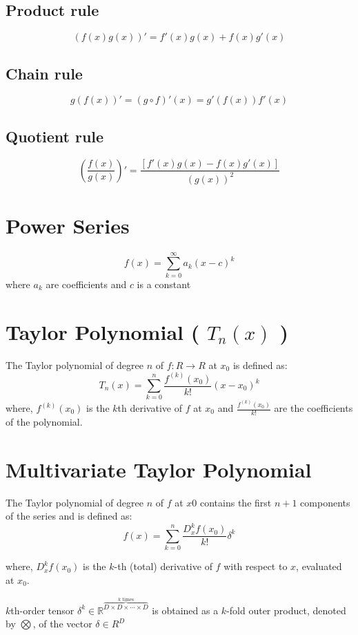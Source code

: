 \subsection{Product rule}
\[
    (f(x)g(x))' = f'(x)g(x) + f(x)g'(x)
\]

\subsection{Chain rule}
\[
    g(f(x))' = (g \circ f)'(x) = g'(f(x))f'(x)
\]

\subsection{Quotient rule}
\[
    \left( \displaystyle\frac{f(x)}{g(x)} \right)' = \displaystyle\frac{[f'(x)g(x) - f(x)g'(x)]}{(g(x))^2}
\]

\section{Power Series}\label{Power Series}
\[
    f(x) = \sum_{k=0}^{\infty} a_k (x-c)^k
\]
where $a_k$ are coefficients and $c$ is a constant

\section{Taylor Polynomial ( $T_n(x)$ )}\label{Taylor Polynomial}
The Taylor polynomial of degree $n$ of $f : R \rightarrow R$ at $x_0$ is defined as: 
\[
    T_n(x) = \sum_{k=0}^{n}\displaystyle\frac{f^{(k)}(x_0)}{k!}(x-x_0)^k
\]
where, $f^{(k)}(x_0)$ is the $k$th derivative of $f$ at $x_0$ and $\displaystyle\frac{f^{(k)}(x_0)}{k!}$ are the coefficients of the polynomial.


\section{Multivariate Taylor Polynomial}\label{Multivariate Taylor Polynomial}
The Taylor polynomial of degree $n$ of $f$ at $x0$ contains the first $n + 1$ components of the series and is defined as:
\[
    f(x) = \sum_{k=0}^{n} \displaystyle\frac{D_x^k f(x_0)}{k!}\delta^k
\]

where, $D_x^kf(x_0)$ is the $k$-th (total) derivative of $f$ with respect to $x$, evaluated at $x_0$.

$k$th-order tensor \( \delta^k \in \mathbb{R}^{\overset{k \text{ times}}{\overbrace{D \times D \times \cdots \times D}}} \) is obtained as a $k$-fold outer product, denoted by $\bigotimes$, of the vector $\delta \in R^D$

